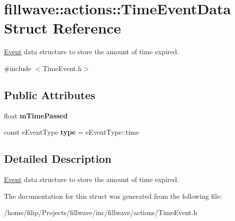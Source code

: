 \hypertarget{structfillwave_1_1actions_1_1TimeEventData}{}\section{fillwave\+:\+:actions\+:\+:Time\+Event\+Data Struct Reference}
\label{structfillwave_1_1actions_1_1TimeEventData}


\hyperlink{classfillwave_1_1actions_1_1Event}{Event} data structure to store the amount of time expired.  




{\ttfamily \#include $<$Time\+Event.\+h$>$}

\subsection*{Public Attributes}
\begin{DoxyCompactItemize}
\item 
\hypertarget{structfillwave_1_1actions_1_1TimeEventData_ab681cf6d829d24e8e0c452fa153c0e51}{}float {\bfseries m\+Time\+Passed}\label{structfillwave_1_1actions_1_1TimeEventData_ab681cf6d829d24e8e0c452fa153c0e51}

\item 
\hypertarget{structfillwave_1_1actions_1_1TimeEventData_ac527a69c3085a488306507da70cca3e5}{}const e\+Event\+Type {\bfseries type} = e\+Event\+Type\+::time\label{structfillwave_1_1actions_1_1TimeEventData_ac527a69c3085a488306507da70cca3e5}

\end{DoxyCompactItemize}


\subsection{Detailed Description}
\hyperlink{classfillwave_1_1actions_1_1Event}{Event} data structure to store the amount of time expired. 

The documentation for this struct was generated from the following file\+:\begin{DoxyCompactItemize}
\item 
/home/filip/\+Projects/fillwave/inc/fillwave/actions/Time\+Event.\+h\end{DoxyCompactItemize}
